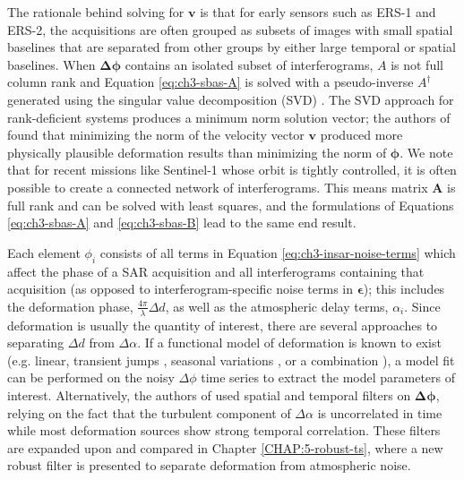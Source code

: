 The rationale behind solving for $\bm{v}$ is that for early sensors such as ERS-1 and ERS-2, the acquisitions are often grouped as subsets of images with small spatial baselines that are separated from other groups by either large temporal or spatial baselines. 
When $\bm{\Delta \phi}$ contains an isolated subset of interferograms, $A$ is not full column rank and Equation \eqref{eq:ch3-sbas-A} is solved with a pseudo-inverse $A^{\dagger}$ generated using the singular value decomposition (SVD) \citep{Strang2006LinearAlgebraIts}. The SVD approach for rank-deficient systems produces a minimum norm solution vector; the authors of \cite{Berardino2002NewAlgorithmSurface} found that minimizing the norm of the velocity vector $ \bm{v} $ produced more physically plausible deformation results than minimizing the norm of $ \bm{\phi} $. We note that for recent missions like Sentinel-1 whose orbit is tightly controlled, it is often possible to create a connected network of interferograms. This means matrix $ \bm{A} $ is full rank and can be solved with least squares, and the formulations of Equations \eqref{eq:ch3-sbas-A} and \eqref{eq:ch3-sbas-B} lead to the same end result.


Each element $\phi_i$ consists of all terms in Equation \eqref{eq:ch3-insar-noise-terms} which affect the phase of a SAR acquisition and all interferograms containing that acquisition (as opposed to interferogram-specific noise terms in $ \bm{\epsilon} $); this includes the deformation phase, $\frac{4 \pi}{\lambda} \Delta d$, as well as the atmospheric delay terms, $\alpha_i$.
Since deformation is usually the quantity of interest, there are several approaches to separating $ \Delta d $ from $\Delta \alpha$.
If a functional model of deformation is known to exist (e.g. linear, transient jumps \citep{Chen20142010SlowSlip, Fielding2017SurfaceDeformationNorth}, seasonal variations \citep{Murray2018ShortLivedPause}, or a combination \citep{Riel2018QuantifyingGroundDeformation}), a model fit can be performed on the noisy $ \Delta \phi $ time series to extract the model parameters of interest.
Alternatively, the authors of \cite{Berardino2002NewAlgorithmSurface} used spatial and temporal filters on $\bm{\Delta \phi}$, relying on the fact that the turbulent component of $\Delta \alpha$ is uncorrelated in time \citep{Emardson2003NeutralAtmosphericDelay} while most deformation sources show strong temporal correlation.
These filters are expanded upon and compared in Chapter \ref{CHAP:5-robust-ts}, where a new robust filter is presented to separate deformation from atmospheric noise.


